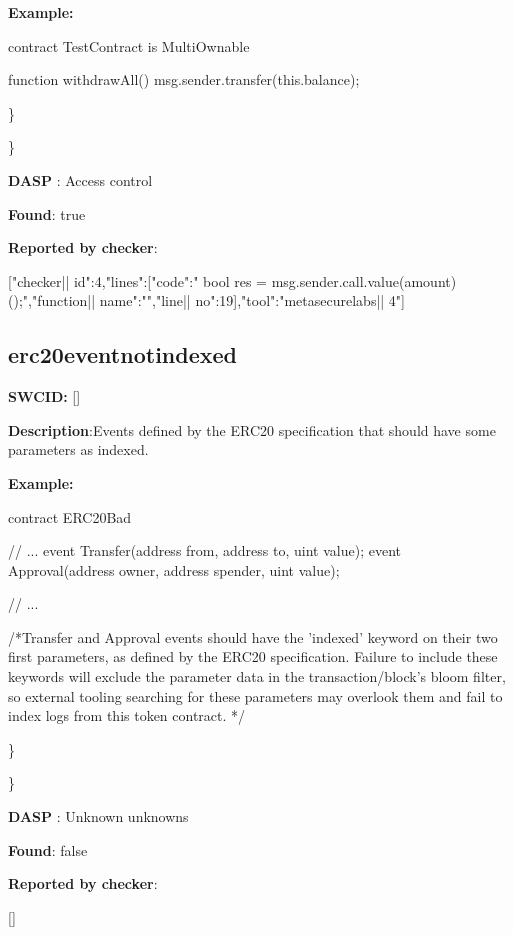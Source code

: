\documentclass{article}
\begin{document}
\textbf{Example:} 
\begin{ffcode} 

contract TestContract is MultiOwnable {

  function withdrawAll(){
    msg.sender.transfer(this.balance);
  }
}

\end{ffcode} 
\} 

\} 

\textbf{DASP} : Access control

\textbf{Found}: true

\textbf{Reported by checker}: 
\begin{ffcode} 

[{"checker|\textunderscore| id":4,"lines":[{"code":"      bool res = msg.sender.call.value(amount)();\n","function|\textunderscore| name":"","line|\textunderscore| no":19}],"tool":"metasecurelabs|\textendash| 4"}]
\end{ffcode} 
\subsection{erc20{\textunderscore}event{\textunderscore}not{\textunderscore}indexed} 
\textbf{SWC{\textunderscore}ID:} []

\textbf{Description}:Events defined by the ERC20 specification that should have some parameters as indexed.


\textbf{Example:} 
\begin{ffcode} 

contract ERC20Bad {
    // ...
    event Transfer(address from, address to, uint value);
    event Approval(address owner, address spender, uint value);

    // ...
}

 /*Transfer and Approval events should have the 'indexed' keyword on their two first parameters, as defined by the ERC20 specification. Failure to include these keywords will exclude the parameter data in the transaction/block's bloom filter, so external tooling searching for these parameters may overlook them and fail to index logs from this token contract. */ 

\end{ffcode} 
\} 

\} 

\textbf{DASP} : Unknown unknowns

\textbf{Found}: false

\textbf{Reported by checker}: 
\begin{ffcode} 

[]
\end{ffcode} 
\end{document}
